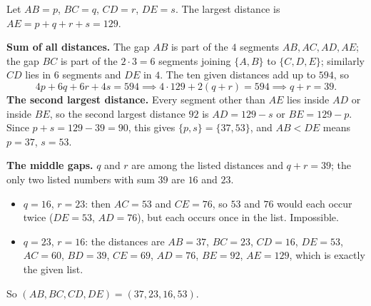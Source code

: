 Let $AB=p$, $BC=q$, $CD=r$, $DE=s$. The largest distance is $AE=p+q+r+s=129$.

\textbf{Sum of all distances.} The gap $AB$ is part of the $4$ segments $AB,AC,AD,AE$; the gap $BC$ is part of the $2\cdot3=6$ segments joining $\{A,B\}$ to $\{C,D,E\}$; similarly $CD$ lies in $6$ segments and $DE$ in $4$. The ten given distances add up to $594$, so
\[
4p+6q+6r+4s=594\implies4\cdot129+2(q+r)=594\implies q+r=39 .
\]
\textbf{The second largest distance.} Every segment other than $AE$ lies inside $AD$ or inside $BE$, so the second largest distance $92$ is $AD=129-s$ or $BE=129-p$. Since $p+s=129-39=90$, this gives $\{p,s\}=\{37,53\}$, and $AB<DE$ means $p=37$, $s=53$.

\textbf{The middle gaps.} $q$ and $r$ are among the listed distances and $q+r=39$; the only two listed numbers with sum $39$ are $16$ and $23$.
\begin{itemize}
\item $q=16$, $r=23$: then $AC=53$ and $CE=76$, so $53$ and $76$ would each occur twice ($DE=53$, $AD=76$), but each occurs once in the list. Impossible.
\item $q=23$, $r=16$: the distances are $AB=37$, $BC=23$, $CD=16$, $DE=53$, $AC=60$, $BD=39$, $CE=69$, $AD=76$, $BE=92$, $AE=129$, which is exactly the given list.
\end{itemize}
So $(AB,BC,CD,DE)=\boxed{(37,23,16,53)}$.
